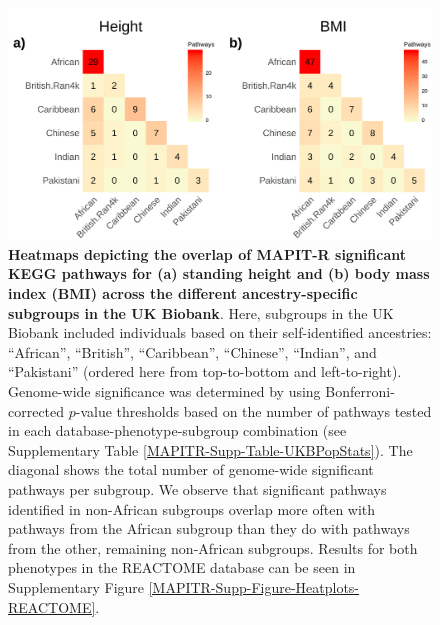 \documentclass[10pt]{article}
\begin{document}
\begin{figure}[htb]
\centering
\includegraphics[width=\textwidth]{Images/Main/Figure2.png}
\caption{\textbf{Heatmaps depicting the overlap of MAPIT-R significant KEGG pathways for (a) standing height and (b) body mass index (BMI) across the different ancestry-specific subgroups in the UK Biobank}. Here, subgroups in the UK Biobank included individuals based on their self-identified ancestries: ``African'', ``British'', ``Caribbean'', ``Chinese'', ``Indian'', and ``Pakistani'' (ordered here from top-to-bottom and left-to-right). Genome-wide significance was determined by using Bonferroni-corrected $p$-value thresholds based on the number of pathways tested in each database-phenotype-subgroup combination (see Supplementary Table \ref{MAPITR-Supp-Table-UKBPopStats}). The diagonal shows the total number of genome-wide significant pathways per subgroup. We observe that significant pathways identified in non-African subgroups overlap more often with pathways from the African subgroup than they do with pathways from the other, remaining non-African subgroups. Results for both phenotypes in the REACTOME database can be seen in Supplementary Figure \ref{MAPITR-Supp-Figure-Heatplots-REACTOME}.}
\label{MAPITR-Main-Figure-Heatplots-KEGG}
\end{figure}

\end{document}
